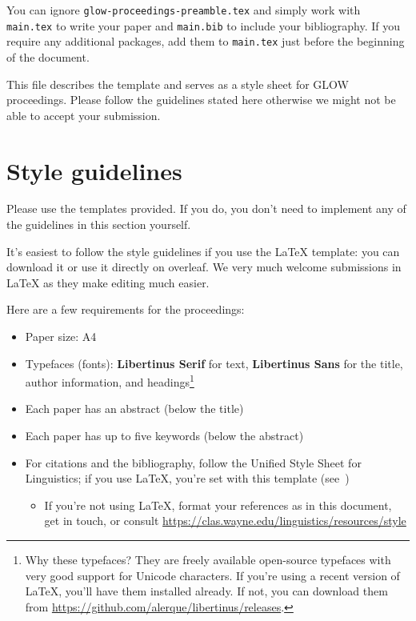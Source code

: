 You can ignore \texttt{glow-proceedings-preamble.tex} and simply work with
\texttt{main.tex} to write your paper and \texttt{main.bib} to include your
bibliography. If you require any additional packages, add them to
\texttt{main.tex} just before the beginning of the document.

This file describes the template and serves as a style sheet for GLOW proceedings.
Please follow the guidelines stated here otherwise we might not be able to accept
your submission.

\section{Style guidelines}

Please use the templates provided. If you do, you don't need to implement any of
the guidelines in this section yourself.

It's easiest to follow the style guidelines if you use the \LaTeX{} template:
you can download it or use it directly on overleaf. We very much welcome
submissions in \LaTeX{} as they make editing much easier.

Here are a few requirements for the proceedings:

\begin{itemize}
    \item Paper size: A4
    \item Typefaces (fonts): \textbf{Libertinus Serif} for text,
        \textbf{Libertinus Sans} for the title, author information, and
        headings\footnote{Why these typefaces? They are freely available
        open-source typefaces with very good support for Unicode characters.
        If you're using a recent version of \LaTeX{}, you'll have them
        installed already. If not, you can download them from
    \url{https://github.com/alerque/libertinus/releases}.}
    \item Each paper has an abstract (below the title)
    \item Each paper has up to five keywords (below the abstract)
    \item For citations and the bibliography, follow the Unified Style Sheet
        for Linguistics; if you use \LaTeX{}, you're set with this template
        (see~)
        \begin{itemize}
            \item If you're not using \LaTeX{}, format your references as in
                this document, get in touch, or consult
                \url{https://clas.wayne.edu/linguistics/resources/style}
        \end{itemize}
\end{itemize}

